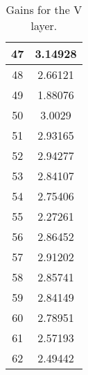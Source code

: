 \begin{table}[h]
\begin{subtable}[h]{2in}
{\begin{tabular}{|c|c|}
47	&	3.14928	\\	\hline
48	&	2.66121	\\	\hline
49	&	1.88076	\\	\hline
50	&	3.0029	\\	\hline
51	&	2.93165	\\	\hline
52	&	2.94277	\\	\hline
53	&	2.84107	\\	\hline
54	&	2.75406	\\	\hline
55	&	2.27261	\\	\hline
56	&	2.86452	\\	\hline
57	&	2.91202	\\	\hline
58	&	2.85741	\\	\hline
59	&	2.84149	\\	\hline
60	&	2.78951	\\	\hline
61	&	2.57193	\\	\hline
62	&	2.49442	\\	\hline
        \end{tabular}
        }
        \caption{Gains for the V layer.}
    \end{subtable}
    \quad
    \begin{subtable}[h]{2in}
        \centering{}
\end{subtable}
\end{table}
